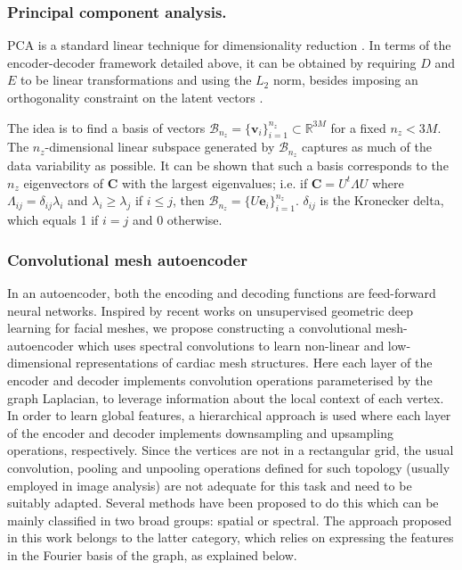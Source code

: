 \subsubsection{Principal component analysis.}
PCA is a standard linear technique for dimensionality reduction \cite{pearson_pca}. In terms of the encoder-decoder framework detailed above, it can be obtained by requiring $D$ and $E$ to be linear transformations and using the $L_2$ norm, besides imposing an orthogonality constraint on the latent vectors \cite{goodfellow-et-al-2016}.

The idea is to find a basis of vectors  $\mathcal{B}_{n_z}=\{\textbf{v}_i\}_{i=1}^{n_z}\subset\mathbb{R}^{3M}$
for a fixed $n_z < 3M$. The $n_z$-dimensional linear subspace generated by $\mathcal{B}_{n_z}$ captures as much of the data variability as possible. It can be shown that such a basis corresponds to the $n_z$ eigenvectors of  $\textbf{C}$ with the largest eigenvalues; i.e. if $\textbf{C}=U^{t}\Lambda U$ where $\Lambda_{ij}=\delta_{ij}\lambda_i$ and $\lambda_i \geq \lambda_j$ if $i\leq j$, then $\mathcal{B}_{n_z}=\{{U\textbf{e}_i}\}_{i=1}^{n_z}$.
$\delta_{ij}$ is the Kronecker delta, which equals 1 if $i=j$ and 0 otherwise.

\subsubsection{Convolutional mesh autoencoder}
In an autoencoder, both the encoding and decoding functions are feed-forward neural networks.
Inspired by recent works on unsupervised geometric deep learning \cite{ref_coma} for facial meshes, we propose constructing a convolutional mesh-autoencoder which uses spectral convolutions \cite{ref_spectral_graph_conv} to learn non-linear and low-dimensional representations of cardiac mesh structures. Here each layer of the encoder and decoder implements convolution operations parameterised by the graph Laplacian, to leverage information about the local context of each vertex. In order to learn global features, a hierarchical approach is used where each layer of the encoder and decoder implements downsampling and upsampling operations, respectively. 
Since the vertices are not in a rectangular grid, the usual convolution, pooling and unpooling operations defined for such topology (usually employed in image analysis) are not adequate for this task and need to be suitably adapted. Several methods have been proposed to do this \cite{ref_bronstein_geom_DL} which can be mainly classified in two broad groups: spatial or spectral. The approach proposed in this work belongs to the latter category, which relies on expressing the features in the Fourier basis of the graph, as explained below.

